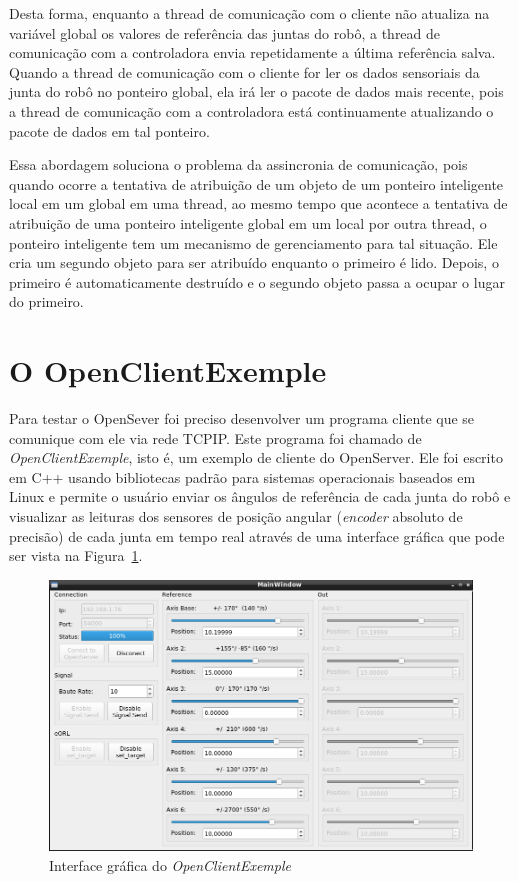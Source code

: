             Desta forma, enquanto a thread de comunicação com o cliente não atualiza na variável global os valores de referência das juntas do robô, a thread de comunicação com a controladora envia repetidamente a última referência salva. Quando a thread de comunicação com o cliente for ler os dados sensoriais da junta do robô no ponteiro global, ela irá ler o pacote de dados mais recente, pois a thread de comunicação com a controladora está continuamente atualizando o pacote de dados em tal ponteiro.
            
            Essa abordagem soluciona o problema da assincronia de comunicação, pois quando ocorre a tentativa de atribuição de um objeto de um ponteiro inteligente local em um global em uma thread, ao mesmo tempo que acontece a tentativa de atribuição de uma ponteiro inteligente global em um local por outra thread, o ponteiro inteligente tem um mecanismo de gerenciamento para tal situação. Ele cria um segundo objeto para ser atribuído enquanto o primeiro é lido. Depois, o primeiro é automaticamente destruído e o segundo objeto passa a ocupar o lugar do primeiro.
        
    \section{O OpenClientExemple}
    
        Para testar o OpenSever foi preciso desenvolver um programa cliente que se comunique com ele via rede \ac{TCPIP}. Este programa foi chamado de \textit{OpenClientExemple}, isto é, um exemplo de cliente do OpenServer. Ele foi escrito em C++ usando bibliotecas padrão para sistemas operacionais baseados em Linux e permite o usuário enviar os ângulos de referência de cada junta do robô e visualizar as leituras dos sensores de posição angular (\textit{encoder} absoluto de precisão) de cada junta em tempo real através de uma interface gráfica que pode ser vista na Figura~\ref{openclient_}. 
    
        \begin{figure}[H]
            \centering
            \includegraphics[width=\columnwidth]{imagens/Softwares/openclient_.png}
            \small 
            \centering 
            \caption{Interface gráfica do \textit{OpenClientExemple}}
            \label{openclient_}
        \end{figure}
        
